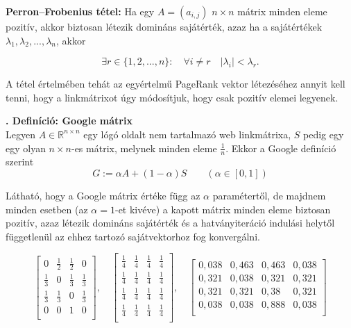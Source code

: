 \documentclass[12pt,a4paper]{article}
\newcounter{definicioszam}
\newenvironment{definicio}[1]
{{\medskip}\noindent \stepcounter{definicioszam}
{\bfseries{\thedefinicioszam. Definíció: #1\\[1ex]}}}{\bigskip }
\begin{document}
\vspace{0.1cm}
\textbf{Perron–Frobenius tétel:} Ha egy $A = (a_{i,j})$ $n \times n$ mátrix minden eleme pozitív, akkor biztosan létezik domináns sajátérték, azaz ha a sajátértékek $\lambda_1 , \lambda_2 , ... , \lambda_n$, akkor

\[ \exists r \in \{1,2,...,n\}: \quad \forall i \neq r \quad |\lambda_i| < \lambda_r.  \]

A tétel értelmében tehát az egyértelmű PageRank vektor létezéséhez annyit kell tenni, hogy a linkmátrixot úgy módosítjuk, hogy csak pozitív elemei legyenek.

\begin{definicio}{Google mátrix}
	Legyen $A \in \mathbb{R}^{n \times n}$ egy lógó oldalt nem tartalmazó web linkmátrixa, $S$ pedig egy egy olyan $n \times n$-es mátrix, melynek minden eleme $\frac{1}{n}$. Ekkor a Google definíció szerint
	\[ G := \alpha A + (1-\alpha) S \qquad (\alpha \in [0,1]) \]
\end{definicio}
\vspace{-1cm}

Látható, hogy a Google mátrix értéke függ az $\alpha$ paramétertől, de majdnem minden esetben (az $\alpha = 1$-et kivéve) a kapott mátrix minden eleme biztosan pozitív, azaz létezik domináns sajátérték és a hatványiteráció indulási helytől függetlenül az ehhez tartozó sajátvektorhoz fog konvergálni.

\[
\begin{bmatrix}
0 & \frac{1}{2} & \frac{1}{2} & 0 \\
\frac{1}{3} & 0 & \frac{1}{3} & \frac{1}{3} \\
\frac{1}{3} & \frac{1}{3} & 0 & \frac{1}{3} \\
0 & 0 & 1 & 0 \\
\end{bmatrix}, \quad
\begin{bmatrix}
\frac{1}{4} & \frac{1}{4} & \frac{1}{4} & \frac{1}{4} \\
\frac{1}{4} & \frac{1}{4} & \frac{1}{4} & \frac{1}{4} \\
\frac{1}{4} & \frac{1}{4} & \frac{1}{4} & \frac{1}{4} \\
\frac{1}{4} & \frac{1}{4} & \frac{1}{4} & \frac{1}{4} \\
\end{bmatrix}, \quad
\begin{bmatrix}
0,038 & 0,463 & 0,463 & 0,038 \\
0,321 & 0,038 & 0,321 & 0,321 \\
0,321 & 0,321 & 0,38 & 0,321 \\
0,038 & 0,038 & 0,888 & 0,038 \\
\end{bmatrix}
\]
\end{document}
